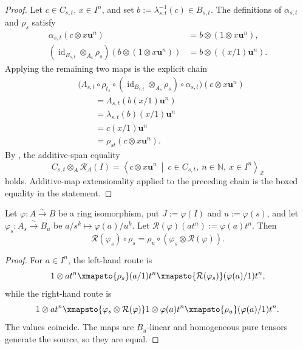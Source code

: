 \begin{proof}
  Let $c\in C_{s,t}$, $x\in I^n$, and set
  $b:=\lambda_{s,t}^{-1}(c)\in B_{s,t}$.  The definitions of
  $\alpha_{s,t}$ and $\rho_s$ satisfy
  \[
  \begin{aligned}
    \alpha_{s,t}(c\otimes x\mathbf u^n)
      &=b\otimes(1\otimes x\mathbf u^n),\\
    (\operatorname{id}_{B_{s,t}}\otimes_{A_s}\rho_s)
      (b\otimes(1\otimes x\mathbf u^n))
      &=b\otimes((x/1)\mathbf u^n).
  \end{aligned}
  \]
  Applying the remaining two maps is the explicit chain
  \[
  \begin{aligned}
    &\bigl(\Lambda_{s,t}\circ\rho_{t_s}\circ
      (\operatorname{id}_{B_{s,t}}\otimes_{A_s}\rho_s)
      \circ\alpha_{s,t}\bigr)(c\otimes x\mathbf u^n)\\
      &\qquad
       =\Lambda_{s,t}(b(x/1)\mathbf u^n)\\
      &\qquad
       =\lambda_{s,t}(b)(x/1)\mathbf u^n\\
      &\qquad
       =c(x/1)\mathbf u^n\\
      &\qquad
       =\rho_{st}(c\otimes x\mathbf u^n).
  \end{aligned}
  \]
  By , the additive-span equality
  \[
    C_{s,t}\otimes_A\mathcal R_A(I)
      =\left\langle c\otimes x\mathbf u^n
        \ \middle|\ c\in C_{s,t},\ n\in\mathbb N,\ x\in I^n
        \right\rangle_{\mathbb Z}
  \]
  holds.  Additive-map extensionality applied to the preceding chain is the
  boxed equality in the statement.
\end{proof}

\begin{lemma}
  \label{lemma:nagata-rees-localization-natural}

  Let $\varphi\colon A\xrightarrow{\sim}B$ be a ring isomorphism, put
  $J:=\varphi(I)$ and $u:=\varphi(s)$, and let
  $\varphi_s\colon A_s\xrightarrow{\sim}B_u$ be
  $a/s^k\mapsto\varphi(a)/u^k$.  Let
  $\mathcal R(\varphi)(at^n):=\varphi(a)t^n$.  Then
  \[
    \mathcal R(\varphi_s)\circ\rho_s
      =\rho_u\circ(\varphi_s\otimes\mathcal R(\varphi)).
  \]
\end{lemma}

\begin{proof}
  For $a\in I^n$, the left-hand route is
  \[
    1\otimes at^n\xmapsto{\rho_s}(a/1)t^n
      \xmapsto{\mathcal R(\varphi_s)}(\varphi(a)/1)t^n,
  \]
  while the right-hand route is
  \[
    1\otimes at^n
      \xmapsto{\varphi_s\otimes\mathcal R(\varphi)}
        1\otimes\varphi(a)t^n
      \xmapsto{\rho_u}(\varphi(a)/1)t^n.
  \]
  The values coincide.  The maps are $B_u$-linear and homogeneous pure
  tensors generate the source, so they are equal.
\end{proof}

